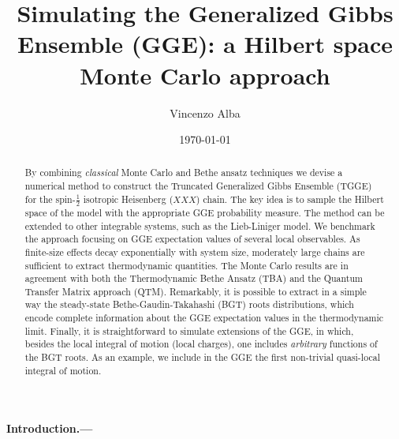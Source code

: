 \documentclass[twocolumn,superscriptaddress,prb,10pt]{revtex4-1}
\begin{document}
\title{Simulating the Generalized Gibbs Ensemble (GGE): a Hilbert space 
Monte Carlo approach} 

\author{Vincenzo Alba}

\date{\today}




\begin{abstract} 

By combining {\it classical} Monte Carlo and Bethe ansatz techniques we devise a numerical 
method to construct the Truncated Generalized Gibbs Ensemble (TGGE) for the spin-$\frac{1}{2}$ 
isotropic Heisenberg ($XXX$) chain. The key idea is to sample the Hilbert space of the model 
with the appropriate GGE probability measure. The method can be extended to other integrable 
systems, such as the Lieb-Liniger model. We benchmark the approach focusing on 
GGE expectation values of several local observables. 
As finite-size effects decay exponentially with system size, moderately large chains are sufficient to 
extract thermodynamic quantities. The Monte Carlo results are in  
agreement with both the Thermodynamic Bethe Ansatz (TBA) and the Quantum Transfer Matrix approach (QTM). 
Remarkably, it is possible to extract in a simple way the steady-state 
Bethe-Gaudin-Takahashi (BGT) roots distributions, which encode complete information about the GGE 
expectation values in the thermodynamic limit. Finally, it is straightforward to simulate extensions 
of the GGE, in which, besides the local integral of motion (local charges), one includes {\it arbitrary} 
functions of the BGT roots. As an example, we include in the GGE the first non-trivial quasi-local 
integral of motion. 


\end{abstract}


\maketitle


\paragraph*{Introduction.---}
\end{document}
